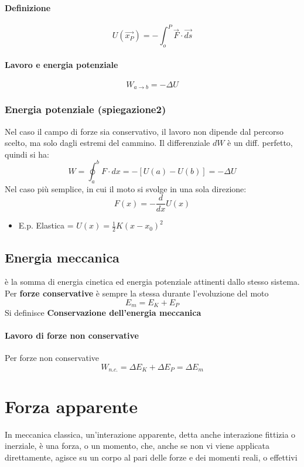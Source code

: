 \documentclass[a4paper]{report}
\begin{document}
  \paragraph{Definizione}
  $$ U(\vec{x_P}) = - \int_o^P \vec{F}\cdot \vec{ds} $$
  \paragraph{Lavoro e energia potenziale}
  $$ W_{a\rightarrow b} = -\Delta U $$

  \subsubsection{Energia potenziale (spiegazione2)}
  Nel caso il campo di forze sia conservativo, il lavoro non dipende dal percorso scelto, ma solo dagli estremi del cammino. Il differenziale $dW$ è un diff. perfetto, quindi si ha:
  $$W = \oint_a^b F \cdot dx = -[U(a) - U(b)] = -\Delta U$$
  Nel caso più semplice, in cui il moto si svolge in una sola direzione:
  $$ F(x) = -\frac{d}{dx}U(x) $$
  \begin{itemize}
    \item E.p. Elastica = \( U(x) = \frac{1}{2} K (x-x_0 )^2 \)
  \end{itemize}

  \subsection{Energia meccanica}
  è la somma di energia cinetica ed energia potenziale attinenti dallo stesso sistema.\\
  Per \textbf{forze conservative} è sempre la stessa durante l'evoluzione del moto
  $$ E_m = E_K + E_P $$
  Si definisce \textbf{Conservazione dell'energia meccanica}
  \paragraph{Lavoro di forze non conservative}
  Per forze non conservative
  $$ W_{n.c.} = \Delta E_K + \Delta E_P = \Delta E_m $$

  \section{Forza apparente}
  In meccanica classica, un'interazione apparente, detta anche interazione fittizia o inerziale, è una forza, o un momento, che, anche se non vi viene applicata direttamente, agisce su un corpo al pari delle forze e dei momenti reali, o effettivi
\end{document}
